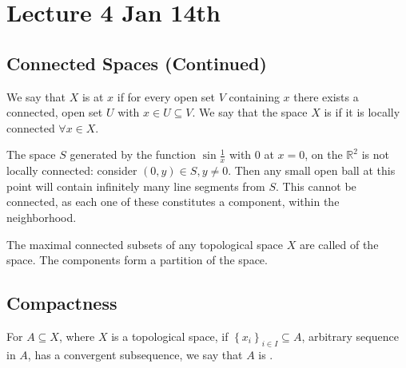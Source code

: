 \documentclass[notoc,notitlepage]{tufte-book}
\begin{document}


\chapter{Lecture 4 Jan 14th}%
\label{chp:lecture_4_jan_14th}

\section{Connected Spaces (Continued)}%
\label{sec:connected_spaces_continued}

\begin{defn}\label{defn:locally_connected}
  We say that $X$ is  at $x$ if for every open set $V$
  containing $x$ there exists a connected, open set $U$ with $x \in U \subseteq V$. We say that
  the space $X$ is  if it is locally connected $\forall x \in X$.
\end{defn}

\begin{eg}
  The space $S$ generated by the function $\sin \frac{1}{x}$ with $0$ at $x = 0$,
  on the $\mathbb{R}^2$ is not locally connected: consider $(0, y) \in S, y \neq 0$.
  Then any small open ball at this point will contain infinitely many line segments from $S$.
  This cannot be connected, as each one of these constitutes a component,
  within the neighborhood.
\end{eg}

\begin{defn}\label{defn:connected_component}
  The maximal connected subsets of any topological space $X$ are called
   of the space. The components form a partition
  of the space.
\end{defn}


\section{Compactness}%
\label{sec:compactness}

\begin{defn}\label{defn:sequential_compactness}
  For $A \subseteq X$, where $X$ is a topological space, if 
  $\left\{ x_i \right\}_{i \in I} \subseteq A$, arbitrary sequence in $A$, has a
  convergent subsequence, we say that $A$ is .
\end{defn}
\end{document}
